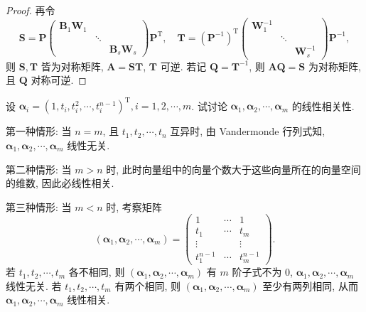 \documentclass[../../main.tex]{subfiles}
\begin{document}
\begin{proof}
再令
$$
\boldsymbol{S} = \boldsymbol{P}\begin{pmatrix}
\boldsymbol{B}_1\boldsymbol{W}_1 & & \\
& \ddots & \\
& & \boldsymbol{B}_s\boldsymbol{W}_s
\end{pmatrix}\boldsymbol{P}^{\mathrm{T}},
\quad
\boldsymbol{T} = (\boldsymbol{P}^{-1})^{\mathrm{T}}\begin{pmatrix}
\boldsymbol{W}_1^{-1} & & \\
& \ddots & \\
& & \boldsymbol{W}_s^{-1}
\end{pmatrix}\boldsymbol{P}^{-1},
$$
则 $\boldsymbol{S}, \boldsymbol{T}$ 皆为对称矩阵, $\boldsymbol{A} = \boldsymbol{S}\boldsymbol{T}$, $\boldsymbol{T}$ 可逆. 若记 $\boldsymbol{Q} = \boldsymbol{T}^{-1}$, 则 $\boldsymbol{A}\boldsymbol{Q} = \boldsymbol{S}$ 为对称矩阵, 且 $\boldsymbol{Q}$ 对称可逆.

\end{proof}

\begin{example}
设 $\boldsymbol{\alpha}_i = (1, t_i, t_i^2, \cdots, t_i^{n-1})^{\mathrm{T}}, i = 1, 2, \cdots, m$. 试讨论 $\boldsymbol{\alpha}_1, \boldsymbol{\alpha}_2, \cdots, \boldsymbol{\alpha}_m$ 的线性相关性.
\end{example}
\begin{solution}
第一种情形: 当 $n = m$, 且 $t_1, t_2, \cdots, t_n$ 互异时, 由 Vandermonde 行列式知, $\boldsymbol{\alpha}_1, \boldsymbol{\alpha}_2, \cdots, \boldsymbol{\alpha}_m$ 线性无关.

第二种情形: 当 $m > n$ 时, 此时向量组中的向量个数大于这些向量所在的向量空间的维数, 因此必线性相关.

第三种情形: 当 $m < n$ 时, 考察矩阵
$$
\left( \boldsymbol{\alpha}_1, \boldsymbol{\alpha}_2, \cdots, \boldsymbol{\alpha}_m \right) = \begin{pmatrix}
1 & \cdots & 1 \\
t_1 & \cdots & t_m \\
\vdots & & \vdots \\
t_1^{n-1} & \cdots & t_m^{n-1}
\end{pmatrix}.
$$
若 $t_1, t_2, \cdots, t_m$ 各不相同, 则 $\left( \boldsymbol{\alpha}_1, \boldsymbol{\alpha}_2, \cdots, \boldsymbol{\alpha}_m \right)$ 有 $m$ 阶子式不为 $0$, $\boldsymbol{\alpha}_1, \boldsymbol{\alpha}_2, \cdots, \boldsymbol{\alpha}_m$ 线性无关. 若 $t_1, t_2, \cdots, t_m$ 有两个相同, 则 $\left( \boldsymbol{\alpha}_1, \boldsymbol{\alpha}_2, \cdots, \boldsymbol{\alpha}_m \right)$ 至少有两列相同, 从而 $\boldsymbol{\alpha}_1, \boldsymbol{\alpha}_2, \cdots, \boldsymbol{\alpha}_m$ 线性相关.

\end{solution}
\end{document}
